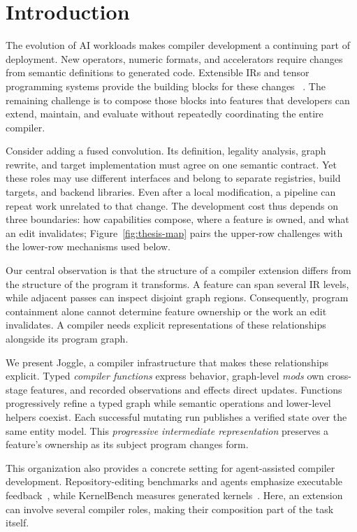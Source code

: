 \section{Introduction}
\label{sec:introduction}

The evolution of AI workloads makes compiler development a continuing part of
deployment. New operators, numeric formats, and accelerators require changes
from semantic definitions to generated code. Extensible IRs and tensor
programming systems provide the building blocks for these changes
~\cite{lattner2021mlir,feng2022tensorir}. The remaining challenge is to compose
those blocks into features that developers can extend, maintain, and evaluate
without repeatedly coordinating the entire compiler.

Consider adding a fused convolution. Its definition, legality analysis, graph
rewrite, and target implementation must agree on one semantic contract. Yet
these roles may use different interfaces and belong to separate registries,
build targets, and backend libraries. Even after a local modification, a
pipeline can repeat work unrelated to that change. The development cost thus
depends on three boundaries: how capabilities compose, where a feature is
owned, and what an edit invalidates; Figure~\ref{fig:thesis-map} pairs the
upper-row challenges with the lower-row mechanisms used below.

Our central observation is that the structure of a compiler extension differs
from the structure of the program it transforms. A feature can span several IR
levels, while adjacent passes can inspect disjoint graph regions. Consequently,
program containment alone cannot determine feature ownership or the work an
edit invalidates. A compiler needs explicit representations of these relationships
alongside its program graph.

We present Joggle, a compiler infrastructure that makes these relationships
explicit. Typed \emph{compiler functions} express behavior, graph-level \emph{mods} own
cross-stage features, and recorded observations and effects direct updates.
Functions progressively refine a typed graph while semantic operations and
lower-level helpers coexist. Each successful mutating run publishes a verified
state over the same entity model. This \emph{progressive intermediate
representation} preserves a feature's ownership as its subject program changes
form.

This organization also provides a concrete setting for agent-assisted compiler
development. Repository-editing benchmarks and agents emphasize executable
feedback~\cite{jimenez2024swebench,yang2024sweagent}, while KernelBench measures
generated kernels~\cite{ouyang2025kernelbench}. Here, an extension can involve
several compiler roles, making their composition part of the task itself.

